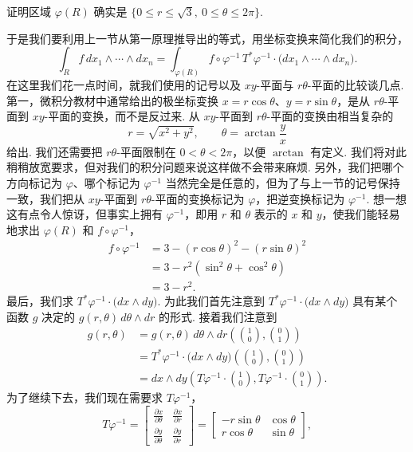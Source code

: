 \begin{question}\label{q:7-3}
证明区域 $\varphi(R)$ 确实是 $\{0\leq r\leq\sqrt{3},\ 0\leq\theta\leq 2\pi\}$.
\end{question}

于是我们要利用上一节从第一原理推导出的等式，用坐标变换来简化我们的积分，
\[
\int_R f\,dx_1\wedge\cdots\wedge dx_n=\int_{\varphi(R)}f\circ\varphi^{-1}\,T^*\varphi^{-1}\cdot\bigl(dx_1\wedge\cdots\wedge dx_n\bigr).
\]
在这里我们花一点时间，就我们使用的记号以及 $xy$-平面与 $r\theta$-平面的比较谈几点. 第一，微积分教材中通常给出的极坐标变换 $x=r\cos\theta$、$y=r\sin\theta$，是从 $r\theta$-平面到 $xy$-平面的变换，而不是反过来. 从 $xy$-平面到 $r\theta$-平面的变换由相当复杂的
\[
r=\sqrt{x^2+y^2},\qquad\theta=\arctan\frac{y}{x}
\]
给出. 我们还需要把 $r\theta$-平面限制在 $0<\theta<2\pi$，以便 $\arctan$ 有定义. 我们将对此稍稍放宽要求，但对我们的积分问题来说这样做不会带来麻烦. 另外，我们把哪个方向标记为 $\varphi$、哪个标记为 $\varphi^{-1}$ 当然完全是任意的，但为了与上一节的记号保持一致，我们把从 $xy$-平面到 $r\theta$-平面的变换标记为 $\varphi$，把逆变换标记为 $\varphi^{-1}$. 想一想这有点令人惊讶，但事实上拥有 $\varphi^{-1}$，即用 $r$ 和 $\theta$ 表示的 $x$ 和 $y$，使我们能轻易地求出 $\varphi(R)$ 和 $f\circ\varphi^{-1}$，
\begin{align*}
f\circ\varphi^{-1}&=3-(r\cos\theta)^2-(r\sin\theta)^2\\
&=3-r^2(\sin^2\theta+\cos^2\theta)\\
&=3-r^2.
\end{align*}
最后，我们求 $T^*\varphi^{-1}\cdot\bigl(dx\wedge dy\bigr)$. 为此我们首先注意到 $T^*\varphi^{-1}\cdot\bigl(dx\wedge dy\bigr)$ 具有某个函数 $g$ 决定的 $g(r,\theta)\,d\theta\wedge dr$ 的形式. 接着我们注意到
\begin{align*}
g(r,\theta)&=g(r,\theta)\,d\theta\wedge dr\left(\binom{1}{0},\binom{0}{1}\right)\\
&=T^*\varphi^{-1}\cdot\bigl(dx\wedge dy\bigr)\left(\binom{1}{0},\binom{0}{1}\right)\\
&=dx\wedge dy\left(T\varphi^{-1}\cdot\binom{1}{0},T\varphi^{-1}\cdot\binom{0}{1}\right).
\end{align*}
为了继续下去，我们现在需要求 $T\varphi^{-1}$，
\[
T\varphi^{-1}=\begin{bmatrix}\frac{\partial x}{\partial\theta}&\frac{\partial x}{\partial r}\\\frac{\partial y}{\partial\theta}&\frac{\partial y}{\partial r}\end{bmatrix}=\begin{bmatrix}-r\sin\theta&\cos\theta\\r\cos\theta&\sin\theta\end{bmatrix},
\]
